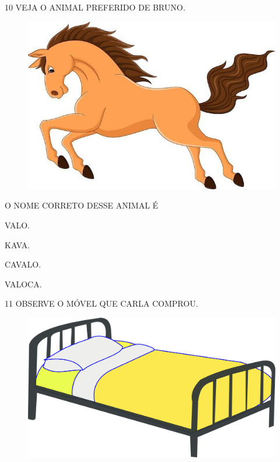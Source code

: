 
\num{10} VEJA O ANIMAL PREFERIDO DE BRUNO.

\begin{figure}[H]
\centering
\includegraphics[width=\textwidth]{media/image234.jpg}
\end{figure}


O NOME CORRETO DESSE ANIMAL É

\begin{escolha}
\item VALO.

\item KAVA.

\item CAVALO.

\item VALOCA.
\end{escolha}


\num{11} OBSERVE O MÓVEL QUE CARLA COMPROU.

\begin{figure}[H]
\centering
\includegraphics[width=.65\textwidth]{media/image235a.png}
\end{figure}

